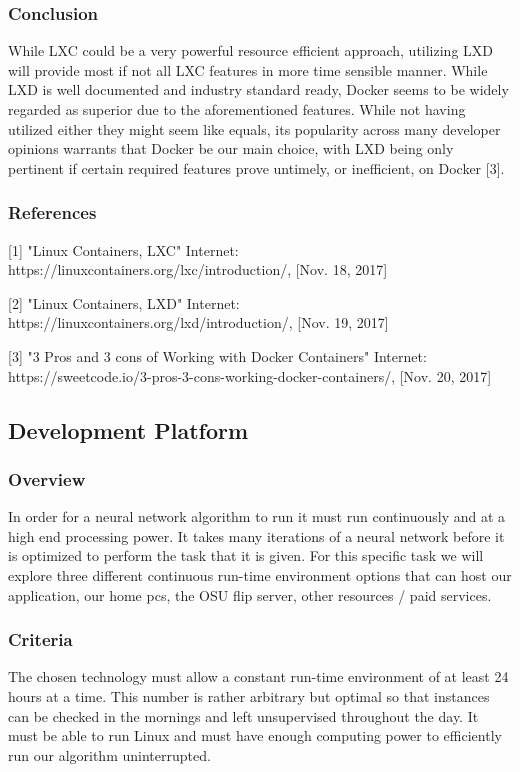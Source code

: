 \documentclass[article, onecolumn, draftclsnofoot,10pt, compsoc]{IEEEtran}
\begin{document}
\subsubsection{Conclusion}
While LXC could be a very powerful resource efficient approach, utilizing LXD will provide most if not all LXC features in more time sensible manner. While LXD is well documented and industry standard ready, Docker seems to be widely regarded as superior due to the aforementioned features. While not having utilized either they might seem like equals, its popularity across many developer opinions warrants that Docker be our main choice, with LXD being only pertinent if certain required features prove untimely, or inefficient, on Docker [3]. 

\subsubsection{References}
[1] "Linux Containers, LXC" Internet: https://linuxcontainers.org/lxc/introduction/, [Nov. 18, 2017]

[2] "Linux Containers, LXD" Internet: https://linuxcontainers.org/lxd/introduction/, [Nov. 19, 2017]

[3] "3 Pros and 3 cons of Working with Docker Containers" Internet: https://sweetcode.io/3-pros-3-cons-working-docker-containers/, [Nov. 20, 2017]

\subsection{Development Platform}
\subsubsection{Overview}
In order for a neural network algorithm to run it must run continuously and at a high end processing power. It takes many iterations of a neural network before it is optimized to perform the task that it is given. For this specific task we will explore three different continuous run-time environment options that can host our application, our home pcs, the OSU flip server, other resources / paid services. 

\subsubsection{Criteria}
The chosen technology must allow a constant run-time environment of at least 24 hours at a time. This number is rather arbitrary but optimal so that instances can be checked in the mornings and left unsupervised throughout the day. It must be able to run Linux and must have enough computing power to efficiently run our algorithm uninterrupted. 
\end{document}
